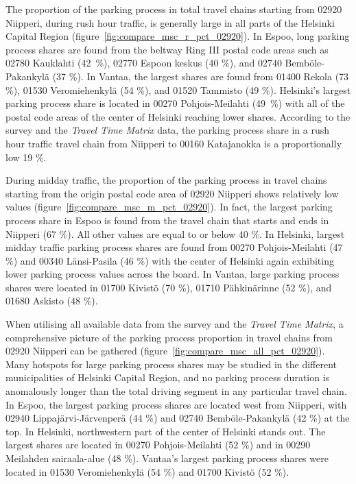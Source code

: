 The proportion of the parking process in total travel chains starting from 02920 Niipperi, during rush hour traffic, is generally large in all parts of the Helsinki Capital Region (figure~\ref{fig:compare_msc_r_pct_02920}). In Espoo, long parking process shares are found from the beltway Ring III postal code areas such as 02780 Kauklahti (42~\%), 02770 Espoon keskus (40 \%), and 02740 Bemböle-Pakankylä (37 \%). In Vantaa, the largest shares are found from 01400 Rekola (73 \%), 01530 Veromiehenkylä (54 \%), and 01520 Tammisto (49 \%). Helsinki's largest parking process share is located in 00270 Pohjois-Meilahti (49~\%) with all of the postal code areas of the center of Helsinki reaching lower shares. According to the survey and the \textit{Travel Time Matrix} data, the parking process share in a rush hour traffic travel chain from Niipperi to 00160 Katajanokka is a proportionally low 19 \%.

During midday traffic, the proportion of the parking process in travel chains starting from the origin postal code area of 02920 Niipperi shows relatively low values (figure~\ref{fig:compare_msc_m_pct_02920}). In fact, the largest parking process share in Espoo is found from the travel chain that starts and ends in Niipperi (67 \%). All other values are equal to or below 40 \%. In Helsinki, largest midday traffic parking process shares are found from 00270 Pohjois-Meilahti (47 \%) and 00340 Länsi-Pasila (46 \%) with the center of Helsinki again exhibiting lower parking process values across the board. In Vantaa, large parking process shares were located in 01700 Kivistö (70 \%), 01710 Pähkinärinne (52 \%), and 01680 Askisto (48 \%).

When utilising all available data from the survey and the \textit{Travel Time Matrix}, a comprehensive picture of the parking process proportion in travel chains from 02920 Niipperi can be gathered (figure~\ref{fig:compare_msc_all_pct_02920}). Many hotspots for large parking process shares may be studied in the different municipalities of Helsinki Capital Region, and no parking process duration is anomalously longer than the total driving segment in any particular travel chain. In Espoo, the largest parking process shares are located west from Niipperi, with 02940 Lippajärvi-Järvenperä (44 \%) and 02740 Bemböle-Pakankylä (42 \%) at the top. In Helsinki, northwestern part of the center of Helsinki stands out. The largest shares are located in 00270 Pohjois-Meilahti (52 \%) and in 00290 Meilahden sairaala-alue (48 \%). Vantaa's largest parking process shares were located in 01530 Veromiehenkylä (54 \%) and 01700 Kivistö (52 \%). 

